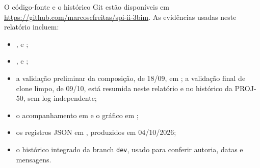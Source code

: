 \documentclass[12pt]{article}
\newcommand{\code}[1]{\texttt{#1}}
\begin{document}
O código-fonte e o histórico Git estão disponíveis em
\url{https://github.com/marcoscfreitas/spi-ii-3bim}. As evidências usadas neste
relatório incluem:

\begin{itemize}
  \item {},  e
  ;
  \item {},  e
  ;
  \item a validação preliminar da composição, de 18/09, em
  ; a validação final de clone limpo, de 09/10,
  está resumida neste relatório e no histórico da PROJ-50, sem log independente;
  \item o acompanhamento em  e o
  gráfico em ;
  \item os registros JSON em , produzidos em 04/10/2026;
  \item o histórico integrado da branch \code{dev}, usado para conferir autoria,
  datas e mensagens.
\end{itemize}



\end{document}

